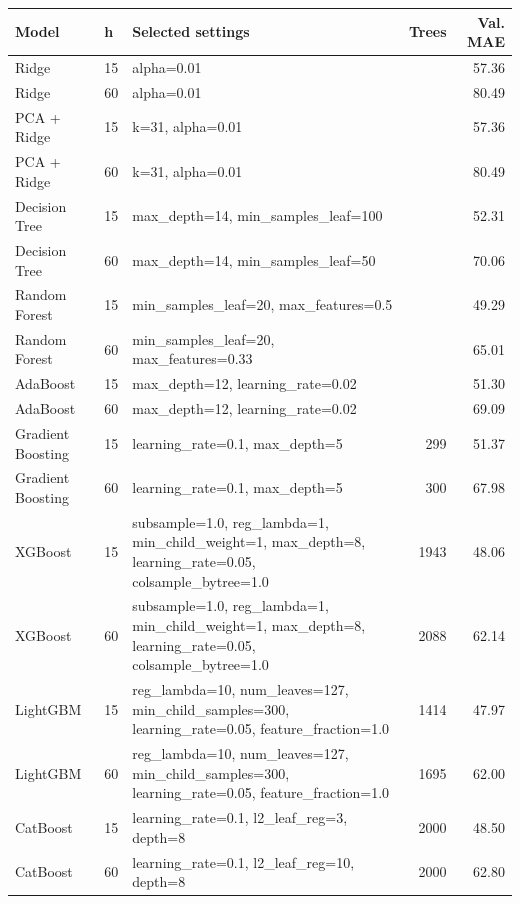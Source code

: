 \begin{tabular}{llp{7.0cm}rr}
\toprule
Model & h & Selected settings & Trees & Val. MAE \\
\midrule
Ridge & 15 & alpha=0.01 &  & 57.36 \\
Ridge & 60 & alpha=0.01 &  & 80.49 \\
PCA + Ridge & 15 & k=31, alpha=0.01 &  & 57.36 \\
PCA + Ridge & 60 & k=31, alpha=0.01 &  & 80.49 \\
Decision Tree & 15 & max\_depth=14, min\_samples\_leaf=100 &  & 52.31 \\
Decision Tree & 60 & max\_depth=14, min\_samples\_leaf=50 &  & 70.06 \\
Random Forest & 15 & min\_samples\_leaf=20, max\_features=0.5 &  & 49.29 \\
Random Forest & 60 & min\_samples\_leaf=20, max\_features=0.33 &  & 65.01 \\
AdaBoost & 15 & max\_depth=12, learning\_rate=0.02 &  & 51.30 \\
AdaBoost & 60 & max\_depth=12, learning\_rate=0.02 &  & 69.09 \\
Gradient Boosting & 15 & learning\_rate=0.1, max\_depth=5 & 299 & 51.37 \\
Gradient Boosting & 60 & learning\_rate=0.1, max\_depth=5 & 300 & 67.98 \\
XGBoost & 15 & subsample=1.0, reg\_lambda=1, min\_child\_weight=1, max\_depth=8, learning\_rate=0.05, colsample\_bytree=1.0 & 1943 & 48.06 \\
XGBoost & 60 & subsample=1.0, reg\_lambda=1, min\_child\_weight=1, max\_depth=8, learning\_rate=0.05, colsample\_bytree=1.0 & 2088 & 62.14 \\
LightGBM & 15 & reg\_lambda=10, num\_leaves=127, min\_child\_samples=300, learning\_rate=0.05, feature\_fraction=1.0 & 1414 & 47.97 \\
LightGBM & 60 & reg\_lambda=10, num\_leaves=127, min\_child\_samples=300, learning\_rate=0.05, feature\_fraction=1.0 & 1695 & 62.00 \\
CatBoost & 15 & learning\_rate=0.1, l2\_leaf\_reg=3, depth=8 & 2000 & 48.50 \\
CatBoost & 60 & learning\_rate=0.1, l2\_leaf\_reg=10, depth=8 & 2000 & 62.80 \\
\bottomrule
\end{tabular}
